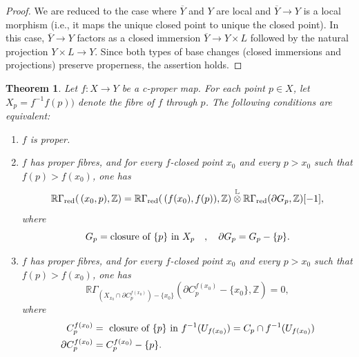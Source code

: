 \documentclass[amssymb,amscd,11pt,20pt]{amsart}
\newcommand{\LL}{{\mathbb L}}
\newcommand{\ZZ}{{\mathbb Z}}
\newcommand{\RR}{\mathbb R}
\newcommand{\0}{\mathbf 0}
\theoremstyle{plain}
\newtheorem{thm}{Theorem}[section]
\numberwithin{equation}{thm}
\begin{document}
\begin{proof} We are reduced to the case where $  \overline Y$ and $ Y$ are local and $  \overline Y\to Y$ is a local morphism (i.e., it maps the unique closed point to unique the closed point). In this case, $\overline Y\to Y$ factors as a closed immersion $\overline Y\to Y\times L$   followed by the natural projection  $Y\times L\to Y$. Since both types of base changes (closed immersions and projections) preserve properness, the assertion holds.
\end{proof}




\begin{thm}\label{thmproperonfibres} Let $f\colon X\to Y$ be a c-proper map. For each point $p\in X$, let    $X_p=f^{-1}f(p))$ denote the fibre of $f$ through $p$. %
The following conditions are equivalent: 
\begin{enumerate}
\item $f$ is proper.
\item $f$ has proper fibres, and for every $f$-closed point $x_0$ and every $p>x_0$ such that $f(p)>f(x_0)$, one has  
\[ \RR\Gamma_{\text{\rm red}}(\,(x_0,p),\ZZ)= \RR\Gamma_{\text{\rm red}}(\, (f(x_0),f(p)),\ZZ)\overset\LL\otimes  \RR\Gamma_{\text{\rm red}}(\partial G_p,\ZZ)[-1],\] where
\[ G_p=\text{\rm closure of } \{p\} \text{ \rm in } X_p\quad , \quad \partial G_p =G_p-\{p\}.\] 
\item $f$ has proper fibres, and for every $f$-closed point $x_0$ and every $p>x_0$ such that $f(p)>f(x_0)$, one has
\[\RR\Gamma_{(X_{x_0}\cap\partial C_p^{f(x_0)})-\{ x_0\}} (\partial C_p^{f(x_0)} -\{x_0\},\ZZ)=0,\] 
where
\[\aligned C_p^{f(x_0)}& =\text{ \rm closure of } \{p\} \text{ \rm in } f^{-1}(U_{f(x_0)}) =C_p\cap f^{-1}(U_{f(x_0)}) \\ \partial C_p^{f(x_0)} &=C_p^{f(x_0)}-\{p\}.\endaligned\] 
\end{enumerate}
\end{thm}
\end{document}
